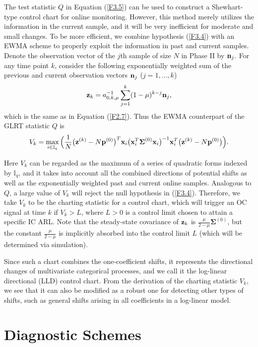 The test statistic $Q$ in Equation (\ref{F3.5}) can be used to construct a
Shewhart-type control chart for online monitoring. However, this method merely
utilizes the information in the current sample, and it will be very inefficient for
moderate and small changes. To be more efficient, we combine hypothesis (\ref{F3.4})
with an EWMA scheme to properly exploit the information in past and current samples.
Denote the observation vector of the $j$th sample of size $N$ in Phase II by ${\bf
n}_j$. For any time point $k$, consider the following exponentially weighted sum of
the previous and current observation vectors ${\bf n}_j$ ($j=1,\ldots,k$)
\[
{\bf z}_k=a_{0,k,\mu}^{-1}\sum_{j=1}^{k}(1-\mu)^{k-j}{\bf n}_j,
\]
which is the same as in Equation (\ref{F2.7}). Thus the EWMA counterpart of the GLRT
statistic $Q$ is
\begin{align}
V_k=\max_{i\in\mathbb{I}_q}\Big(\frac{1}{N}\big({\bf z}^{(k)}-N{\bf
p}^{(0)}\big)^T{\bf x}_i\big({\bf x}_i^T\bm{\Sigma}^{(0)}{\bf x}_i\big)^{-1}{\bf
x}_i^T\big({\bf z}^{(k)}-N{\bf p}^{(0)}\big)\Big).\label{F3.6}
\end{align}

Here $V_k$ can be regarded as the maximum of a series of quadratic forms indexed by
$\mathbb{I}_q$, and it takes into account all the combined directions of potential
shifts as well as the exponentially weighted past and current online samples.
Analogous to $Q$, a large value of $V_k$ will reject the null hypothesis in
(\ref{F3.4}). Therefore, we take $V_k$ to be the charting statistic for a control
chart, which will trigger an OC signal at time $k$ if $V_k>L$, where $L>0$ is a
control limit chosen to attain a specific IC ARL. Note that the steady-state
covariance of ${\bf z}_k$ is $\frac{\mu}{2-\mu}\bm\Sigma^{(0)}$, but the constant
$\frac{\mu}{2-\mu}$ is implicitly absorbed into the control limit $L$ (which will be
determined via simulation).

Since such a chart combines the one-coefficient shifts, it represents the
directional changes of multivariate categorical processes, and we call it the
log-linear directional (LLD) control chart. From the derivation of the charting
statistic $V_k$, we see that it can also be modified as a robust one for detecting
other types of shifts, such as general shifts arising in all coefficients in a
log-linear model.



\section{Diagnostic Schemes}\label{sec3.4}


